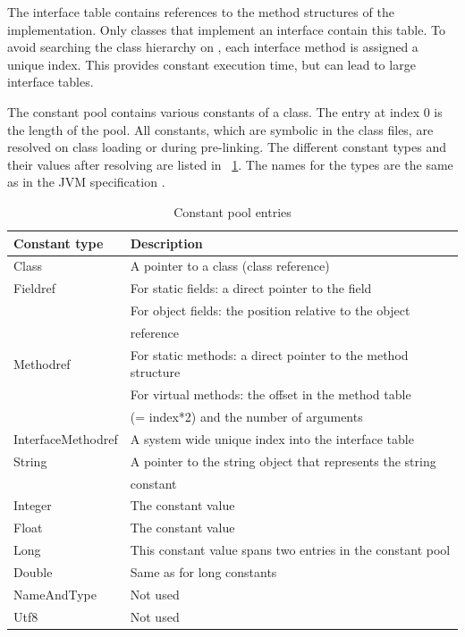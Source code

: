 The interface table contains references to the method structures of
the implementation. Only classes that implement an interface contain
this table. To avoid searching the class hierarchy on
, each interface method is assigned a unique
index. This provides constant execution time, but can lead to large
interface tables.

The constant pool contains various constants of a class. The entry
at index 0 is the length of the pool. All constants, which are
symbolic in the class files, are resolved on class loading or during
pre-linking. The different constant types and their values after
resolving are listed in \tablename~\ref{tab_jvm_const_pool}. The
names for the types are the same as in the JVM specification
\cite{jvm}.


\begin{table}[htbp]
    \centering
    \begin{tabular}{ll}
        \toprule
        Constant type &  Description \\
        \midrule
        Class &  A pointer to a class (class reference) \\
        Fieldref &   For static fields: a direct pointer to the field \\
                &   For object fields: the position relative to the object \\
                & reference \\
        Methodref &  For static methods: a direct pointer to the method structure \\
                & For virtual methods: the offset in the method table \\
                & (= index*2) and the number of arguments \\
        InterfaceMethodref &  A system wide unique index into the interface table \\
        String  & A pointer to the string object that represents the string \\
                & constant \\
        Integer & The constant value \\
        Float   & The constant value \\
        Long    & This constant value spans two entries in the constant pool \\
        Double  & Same as for long constants \\
        NameAndType & Not used \\
        Utf8    & Not used \\
        \bottomrule
    \end{tabular}
    \caption{Constant pool entries}
    \label{tab_jvm_const_pool}
\end{table}
